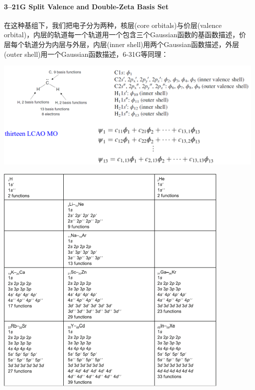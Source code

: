 \paragraph*{3–21G Split Valence and Double-Zeta Basis Set}
在这种基组下，我们把电子分为两种，核层(core orbitals)与价层(valence orbital)，内层的轨道每一个轨道用一个包含三个Gaussian函数的基函数描述，价层每个轨道分为内层与外层，内层(inner shell)用两个Gaussian函数描述，外层(outer shell)用一个Gaussian函数描述，6-31G等同理：
\begin{center}
    \includegraphics[scale=0.9]{fig/lzhx/微信图片_20211102172815}
\end{center}
\begin{center}
    \includegraphics[scale=0.7]{fig/lzhx/微信图片_202111021728151}
\end{center}

